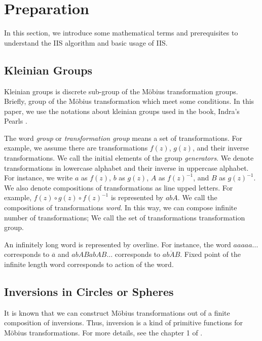 
\section{Preparation}

In this section, we introduce some mathematical terms and prerequisites
to understand the IIS algorithm and basic usage of IIS.

\subsection{Kleinian Groups}

Kleinian groups is discrete sub-group of the M\"obius transformation
groups. Briefly, group of the M\"obius transformation which meet some conditions.
In this paper, we use the notations about kleinian groups used in the
book, Indra's Pearls \cite{MumfordSeriesWright200204}.

The word \textit{group} or \textit{transformation group} means a set of
transformations. 
For example, we assume there are transformations $f(z)$, $g(z)$, and
their inverse transformations.
We call the initial elements of the group \textit{generators}.
We denote transformations in lowercase alphabet and 
their inverse in uppercase alphabet.
For instance, we write $a$ as $f(z)$, $b$ as $g(z)$, $A$ as $f(z)^{-1}$,
and $B$ as $g(z)^{-1}$.
We also denote compositions of transformations as line upped letters.
For example, $f(z) \circ g(z) \circ f(z)^{-1}$ is represented by $abA$.
We call the compositions of transformations \textit{word}.
In this way, we can compose infinite number of transformations;
We call the set of transformations transformation group.

An infinitely long word is represented by overline.
For instance, the word $aaaaa...$ corresponds to $\overline{a}$ and
$abABabAB...$ corresponds to $\overline{abAB}$.
Fixed point of the infinite length word corresponds to action of the
word.

\subsection{Inversions in Circles or Spheres}

It is known that we can construct M\"obius transformations out of a finite
composition of inversions. Thus, inversion is a kind of primitive
functions for M\"obius transformations.
For more details, see the chapter 1 of \cite{marden_2016}.

